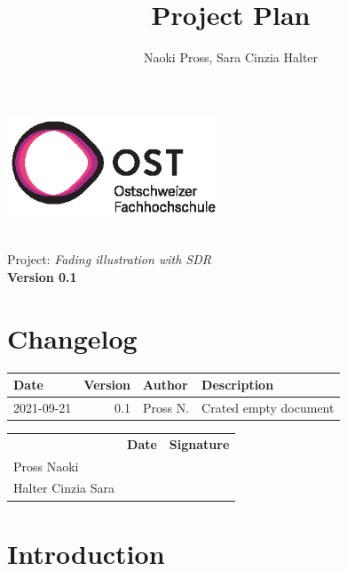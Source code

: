 \documentclass[a4paper, twosided, 11pt]{scrartcl}
\title{Project Plan}
\author{Naoki Pross, Sara Cinzia Halter}
\begin{document}
\begin{titlepage}
  \includegraphics[height=3cm]{fig/ost-logo}
  \begin{flushright}
    \vspace{5cm}
    {\Huge \bfseries \thetitle} \\
    \vspace{5mm}
    {\LARGE Project: \textit{Fading illustration with SDR}} \\
    \vspace{5mm}
    {\LARGE \bfseries Version 0.1}
  \end{flushright}
\end{titlepage}

\section*{Changelog}
\begin{tabularx}{\textwidth}{lrlX}
  \toprule
  \bfseries Date & \bfseries Version & \bfseries Author & \bfseries Description \\
  \midrule
  2021-09-21 & 0.1 & Pross N.  & Crated empty document \\
  \bottomrule
\end{tabularx}

\vfill
{
  \renewcommand{\arraystretch}{2}
  \begin{tabularx}{\textwidth}{lp{}X}
                       & \bfseries Date & \bfseries Signature\\
    Pross Naoki        & \hrulefill & \hrulefill \\
    Halter Cinzia Sara & \hrulefill & \hrulefill \\
  \end{tabularx}
}

\clearpage
\tableofcontents
\listoffigures
\listoftables
\clearpage

\section{Introduction}
\end{document}
